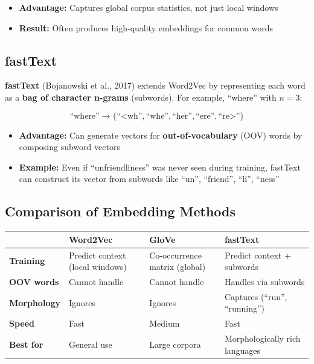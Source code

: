 \documentclass[11pt,a4paper]{article}
\begin{document}
\begin{itemize}[leftmargin=1.5em]
    \item \textbf{Advantage:} Captures global corpus statistics, not just local windows
    \item \textbf{Result:} Often produces high-quality embeddings for common words
\end{itemize}

\subsection{fastText}

\textbf{fastText} (Bojanowski et al., 2017) extends Word2Vec by representing each word as a \textbf{bag of character n-grams} (subwords). For example, ``where'' with $n=3$:

\[
\text{``where''} \to \{\text{``<wh''}, \text{``whe''}, \text{``her''}, \text{``ere''}, \text{``re>''}\}
\]

\begin{itemize}[leftmargin=1.5em]
    \item \textbf{Advantage:} Can generate vectors for \textbf{out-of-vocabulary} (OOV) words by composing subword vectors
    \item \textbf{Example:} Even if ``unfriendliness'' was never seen during training, fastText can construct its vector from subwords like ``un'', ``friend'', ``li'', ``ness''
\end{itemize}

\subsection{Comparison of Embedding Methods}

\begin{center}
\renewcommand{\arraystretch}{1.4}
\begin{tabular}{@{}p{2.5cm}p{3cm}p{3cm}p{3cm}@{}}
\toprule
& \textbf{Word2Vec} & \textbf{GloVe} & \textbf{fastText} \\
\midrule
\textbf{Training} & Predict context (local windows) & Co-occurrence matrix (global) & Predict context + subwords \\
\textbf{OOV words} & Cannot handle & Cannot handle & Handles via subwords \\
\textbf{Morphology} & Ignores & Ignores & Captures (``run'', ``running'') \\
\textbf{Speed} & Fast & Medium & Fast \\
\textbf{Best for} & General use & Large corpora & Morphologically rich languages \\
\bottomrule
\end{tabular}
\end{center}
\end{document}
